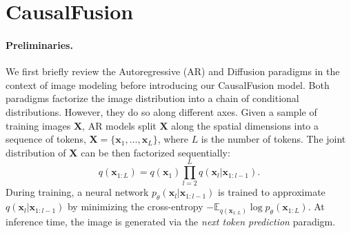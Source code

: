 \section{CausalFusion}


\paragraph{Preliminaries.}\label{sec:background}
We first briefly review the Autoregressive (AR) and Diffusion paradigms in the context of image modeling before introducing our CausalFusion model. Both paradigms factorize the image distribution into a chain of conditional distributions. However, they do so along different axes.
Given a sample of training images $\mathbf{X}$, AR models split $ \mathbf{X} $ along the spatial dimensions into a sequence of tokens, $ \mathbf{X} = \{\mathbf{x}_{1}, \dots, \mathbf{x}_{L}\} $, where $ L $ is the number of tokens. The joint distribution of $ \mathbf{X} $ can be then factorized sequentially:
\begin{equation}\label{eq:AR-factorization}
 q(\mathbf{x}_{1:L}) = q(\mathbf{x}_{1}) \prod_{l=2}^{L} q(\mathbf{x}_{l} | \mathbf{x}_{1:l-1}).
\end{equation}
During training, a neural network $ p_\theta(\mathbf{x}_{l} | \mathbf{x}_{1:l-1}) $ is trained to approximate $ q(\mathbf{x}_{l} | \mathbf{x}_{1:l-1}) $ by minimizing the cross-entropy $ -\mathbb{E}_{q(\mathbf{x}_{1:L})} \log p_\theta(\mathbf{x}_{1:L}) $. At inference time, the image is generated via the \textit{next token prediction} paradigm.

